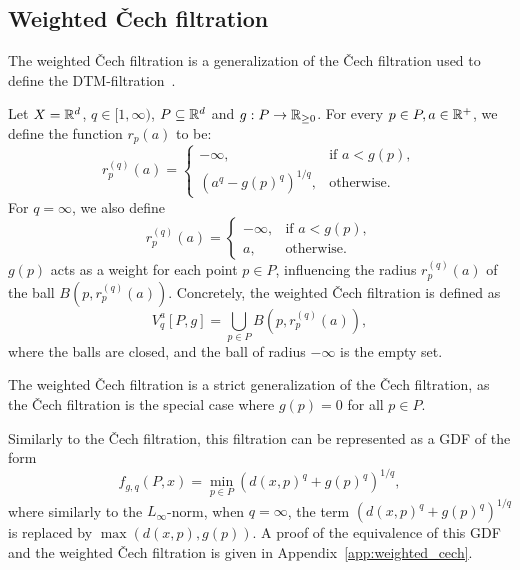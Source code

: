 \subsection{Weighted \v{C}ech filtration}

The weighted \v{C}ech filtration is a generalization of the \v{C}ech filtration
used to define the DTM-filtration~\cite{anai2020dtm}.

\begin{definition}
    Let $X = \mathbb{R}^d$, $q \in [1, \infty)$, $P \subseteq \mathbb{R}^d$ and
    $g : P \to \mathbb{R}_{\geq 0}$. For every $p \in P, a \in \mathbb{R}^+$, we define the
    function $r_p(a)$ to be:
    \begin{equation}
        r_p^{(q)}(a) = \begin{cases}
            - \infty, & \text{if } a < g(p), \\
            (a^q - g(p)^q)^{1/q}, & \text{otherwise}.
        \end{cases}
    \end{equation}
    For $q = \infty$, we also define
    \begin{equation}
        r_p^{(q)}(a) = \begin{cases}
            - \infty, & \text{if } a < g(p), \\
            a, & \text{otherwise}.
        \end{cases}
    \end{equation}
    $g(p)$ acts as a weight for each point $p \in P$, influencing the radius
    $r_p^{(q)}(a)$ of the ball $B(p, r_p^{(q)}(a))$. Concretely, the weighted
    \v{C}ech filtration is defined as
    \begin{equation}
        V^a_q[P, g] = \bigcup_{p \in P} B(p, r_p^{(q)}(a)),
    \end{equation}
    where the balls are closed, and the ball of radius $-\infty$ is the empty
    set.
\end{definition}
The weighted \v{C}ech filtration is a strict generalization of the \v{C}ech
filtration, as the \v{C}ech filtration is the special case where $g(p) = 0$ for
all $p \in P$.

Similarly to the \v{C}ech filtration, this filtration can be represented as a
GDF of the form
\begin{equation}
    f_{g, q}(P, x) = \min_{p \in P} (d(x, p)^{q} + g(p)^{q})^{1/q},
\end{equation}
where similarly to the $L_\infty$-norm, when $q = \infty$, the term
$(d(x, p)^q + g(p)^q)^{1/q}$ is replaced by $\max(d(x, p), g(p))$.
A proof of the equivalence of this GDF and the weighted \v{C}ech filtration is
given in Appendix~\ref{app:weighted_cech}.

